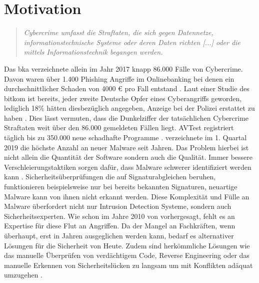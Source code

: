 \documentclass[
    12pt, %
    DIV10,
    ngerman, %
    a4paper, %
    oneside, %
    titlepage, %
    parskip=half, %
    headings=normal, %
    listof=totoc, %
    bibliography=totoc, %
    index=totoc, %
    captions=tableheading, %
    final %
]{scrreprt}
\begin{document}
\section{Motivation}\label{sec:mot}
\begin{quote}
\textsl{Cybercrime umfasst die Straftaten, die sich gegen Datennetze, informationstechnische Systeme
oder deren Daten richten [...] oder die mittels Informationstechnik
begangen werden. \parencite{Cybercrime2017}}
\end{quote}
Das \ac{bka} verzeichnete allein im Jahr 2017 knapp 86.000 Fälle von Cybercrime. Davon waren über 1.400 Phishing Angriffe im Onlinebanking bei denen ein durchschnittlicher Schaden von 4000 € pro Fall entstand \parencite{Cybercrime2017}. Laut einer Studie des \ac{bitkom} ist bereits, jeder zweite Deutsche Opfer eines Cyberangriffs geworden, lediglich 18\% hätten diesbezüglich angegeben, Anzeige bei der Polizei erstattet zu haben \parencite{Bitkome.V.2017}. Dies lässt vermuten, dass die Dunkelziffer der tatsächlichen Cybercrime Straftaten weit über den 86.000 gemeldeten Fällen liegt. AVTest registriert täglich bis zu 350.000 neue schadhafte Programme \parencite{AV-TEST2019}. \textcite{McAfee2019} verzeichnete im 1. Quartal 2019 die höchste Anzahl an  neuer Malware seit Jahren. Das Problem hierbei ist nicht allein die Quantität der Software sondern auch die Qualität. Immer bessere Verschleierungstaktiken sorgen dafür, dass Malware schwerer identifiziert werden kann \parencite{he2017model}. Sicherheitsüberprüfungen die auf Signaturabgleichen beruhen, funktionieren beispielsweise nur bei bereits bekannten Signaturen, neuartige Malware kann von ihnen nicht erkannt werden. Diese Komplexität und Fülle an Malware überfordert nicht nur Intrusion Detection Systeme, sondern auch Sicherheitsexperten. Wie schon im Jahre 2010 von \textcite{Evans2010} vorhergesagt, fehlt es an Expertise für diese Flut an Angriffen. Da der Mangel an Fachkräften, wenn überhaupt, erst in Jahren ausgeglichen werden kann, bedarf es alternativer Lösungen für die Sicherheit von Heute. Zudem sind herkömmliche Lösungen wie das manuelle Überprüfen von verdächtigem Code, Reverse Engineering oder das manuelle Erkennen von Sicherheitslücken zu langsam um mit Konflikten adäquat umzugehen \parencite{Singla2019}.
\\\\ 
\end{document}
